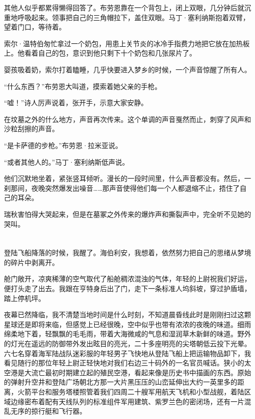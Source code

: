 \documentclass[AutoFakeBold=true]{book}
\begin{document}
其他人似乎都累得懒得回答了。布劳恩靠在一个背包上，闭上双眼，几分钟后就沉重地呼吸起来。领事把自己的三角帽拉下，盖住双眼。马丁·塞利纳斯抱着双臂，望着门口，等待着。

索尔·温特伯匆忙拿过一个奶包，用患上关节炎的冰冷手指费力地把它放在加热板上。他看着自己的包，意识到他只剩下十个奶包和几张尿片了。

婴孩吸着奶，索尔打着瞌睡，几乎快要进入梦乡的时候，一个声音惊醒了所有人。

``什么东西？''布劳恩大叫道，摸索着她父亲的手枪。

``嘘！''诗人厉声说着，张开手，示意大家安静。

在坟墓之外的什么地方，声音再次传来。这个单调的声音戛然而止，刺穿了风声和沙粒刮擦的声音。

``是卡萨德的步枪。''布劳恩·拉米亚说。

``或者其他人的。''马丁·塞利纳斯低声说。

他们沉默地坐着，紧张竖耳倾听。漫长的一段时间里，什么声音都没有。然后，一刹那间，夜晚突然爆发出噪音……那声音使得他们每一个人都退缩不止，捂住了自己的耳朵。

瑞秋害怕得大哭起来，但是在墓冢之外传来的爆炸声和撕裂声中，完全听不见她的哭叫。

\chapter{}

登陆飞船降落的时候，我醒了。{\kaishu 海伯利安}，我想着，依然努力把自己的思绪从梦境的碎片中剥离开。

舱门敞开，凉爽稀薄的空气取代了船舱稠浓混浊的气体，年轻的上尉祝我们好运，便打头走了出去。我跟在亨特身后出了门，走下一条标准人坞斜坡，穿过护盾墙，踏上停机坪。

夜幕已然降临，我不清楚当地时间是什么时刻，不知道晨昏线此时是刚刚扫过这颗星球还是即将来临，但感觉上已经很晚，空中似乎也带有浓浓的夜晚的味道。细雨绵柔地下着，轻飘飘的毛毛雨，带着大海微咸的气息和湿润草木新鲜的味道。野外的灯光在遥远的防御带外发出眩目的亮光，二十多座明亮的尖塔朝低云投下光晕。六七名穿着海军陆战队迷彩服的年轻男子飞快地从登陆飞船上把运输物品卸下，我看见随行的那位年轻上尉正轻快地对我们右边三十码外的一名官员喊话。狭小的太空港是大流亡最初时期建立起的殖民空港，看起来像是历史书中描画的东西。原始的弹射升空井和登陆广场朝北方那一大片黑压压的山峦延伸出大约一英里多的距离，火箭平台和服务塔楼照管着我们四周二十艘军用航天飞机和小型战舰，着陆区域边缘密布着配有天线队列的标准组件军用建筑、紫罗兰色的密闭场，还有一片混乱无序的掠行艇和飞行器。
\end{document}
